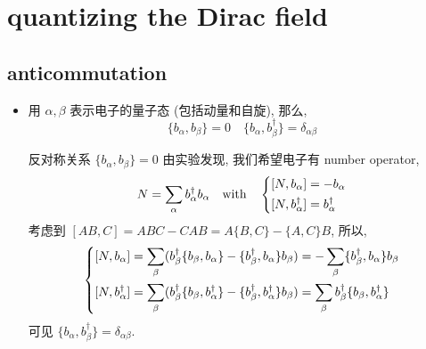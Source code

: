 \chapter{quantizing the Dirac field}
\section{anticommutation} \label{8.1}
\begin{itemize}
	\item 用 $\alpha, \beta$ 表示电子的量子态 (包括动量和自旋), 那么,
	\begin{equation}
		\{b_\alpha, b_\beta\} = 0 \quad \{b_\alpha, b^\dag_\beta\} = \delta_{\alpha \beta}
	\end{equation}
	
	\begin{tcolorbox}[title=comment:]
		反对称关系 $\{b_\alpha, b_\beta\} = 0$ 由实验发现, 我们希望电子有 number operator,
		\begin{equation}
			N = \sum_\alpha b^\dag_\alpha b_\alpha \quad \text{with} \quad \begin{dcases}
				[N, b_\alpha] = - b_\alpha \\
				[N, b^\dag_\alpha] = b^\dag_\alpha
			\end{dcases}
		\end{equation}
		考虑到 $[A B, C] = A B C - C A B = A \{B, C\} - \{A, C\} B$, 所以,
		\begin{equation}
			\begin{dcases}
				[N, b_\alpha] = \sum_\beta (b^\dag_\beta \{b_\beta, b_\alpha\} - \{b^\dag_\beta, b_\alpha\} b_\beta) = - \sum_\beta \{b^\dag_\beta, b_\alpha\} b_\beta \\
				[N, b^\dag_\alpha] = \sum_\beta (b^\dag_\beta \{b_\beta, b^\dag_\alpha\} - \{b^\dag_\beta, b^\dag_\alpha\} b_\beta) = \sum_\beta b^\dag_\beta \{b_\beta, b^\dag_\alpha\}
			\end{dcases}
		\end{equation}
		可见 $\{b_\alpha, b^\dag_\beta\} = \delta_{\alpha \beta}$.
	\end{tcolorbox}
\end{itemize}

